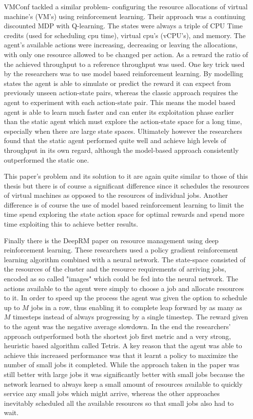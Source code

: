 VMConf tackled a similar problem- configuring the resource allocations of virtual machine's (VM's) using reinforcement learning. Their approach was a continuing discounted MDP with Q-learning. The states were always a triple of CPU Time credits (used for scheduling cpu time), virtual cpu's (vCPU's), and memory. The agent's available actions were increasing, decreasing or leaving the allocations, with only one resource allowed to be changed per action. As a reward the ratio of the achieved throughput to a reference throughput was used. One key trick used by the researchers was to use model based reinforcement learning. By modelling states the agent is able to simulate or predict the reward it can expect from previously unseen action-state pairs, whereas the classic approach requires the agent to experiment with each action-state pair. This means the model based agent is able to learn much faster and can enter its exploitation phase earlier than the static agent which must explore the action-state space for a long time, especially when there are large state spaces. Ultimately however the researchers found that the static agent performed quite well and achieve high levels of throughput in its own regard, although the model-based approach consistently outperformed the static one. 

This paper's problem and its solution to it are again quite similar to those of this thesis but there is of course a significant difference since it schedules the resources of virtual machines as opposed to the resources of individual jobs. Another difference is of course the use of model based reinforcement learning to limit the time spend exploring the state action space for optimal rewards and spend more time exploiting this to achieve better results. 

Finally there is the DeepRM paper on resource management using deep reinforcement learning. These researchers used a policy gradient reinforcement learning algorithm combined with a neural network. The state-space consisted of the resources of the cluster and the resource requirements of arriving jobs, encoded as so called "images" which could be fed into the neural network. The actions available to the agent were simply to choose a job and allocate resources to it. In order to speed up the process the agent was given the option to schedule up to $M$ jobs in a row, thus enabling it to complete leap forward by as many as $M$ timesteps instead of always progressing by a single timestep. The reward given to the agent was the negative average slowdown. In the end the researchers' approach outperformed both the shortest job first metric and a very strong, heuristic based algorithm called Tetris. A key reason that the agent was able to achieve this increased performance was that it learnt a policy to maximize the number of small jobs it completed. While the approach taken in the paper was still better with large jobs it was significantly better with small jobs because the network learned to always keep a small amount of resources available to quickly service any small jobs which might arrive, whereas the other approaches inevitably scheduled all the available resources so that small jobs also had to wait.

